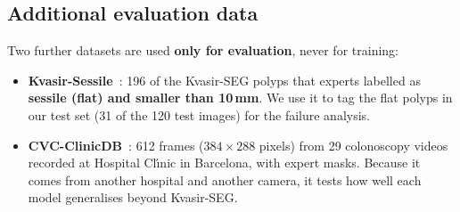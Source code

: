 \subsection{Additional evaluation data}
\label{sec:extra-data}
Two further datasets are used \textbf{only for evaluation}, never for training:
\begin{itemize}
  \item \textbf{Kvasir-Sessile}~\cite{jha2021sessile}: 196 of the Kvasir-SEG polyps that experts labelled as \textbf{sessile
        (flat) and smaller than 10\,mm}. We use it to tag the flat polyps in our test set (31 of the 120 test
        images) for the failure analysis.
  \item \textbf{CVC-ClinicDB}~\cite{bernal2015cvc}: 612 frames ($384\times288$ pixels) from 29 colonoscopy videos recorded at
        Hospital Cl\'{\i}nic in Barcelona, with expert masks. Because it comes from another hospital and another
        camera, it tests how well each model generalises beyond Kvasir-SEG.
\end{itemize}
